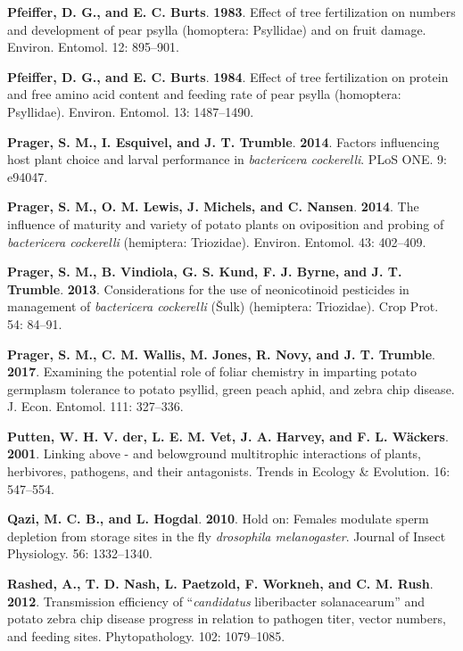 \documentclass[]{article}
\begin{document}
\leavevmode\hypertarget{ref-Pfeiffer1983}{}%
\textbf{Pfeiffer, D. G., and E. C. Burts}. \textbf{1983}. Effect of tree
fertilization on numbers and development of pear psylla (homoptera:
Psyllidae) and on fruit damage. Environ. Entomol. 12: 895--901.

\leavevmode\hypertarget{ref-Pfeiffer1984}{}%
\textbf{Pfeiffer, D. G., and E. C. Burts}. \textbf{1984}. Effect of tree
fertilization on protein and free amino acid content and feeding rate of
pear psylla (homoptera: Psyllidae). Environ. Entomol. 13: 1487--1490.

\leavevmode\hypertarget{ref-Prager2014a}{}%
\textbf{Prager, S. M., I. Esquivel, and J. T. Trumble}. \textbf{2014}.
Factors influencing host plant choice and larval performance in
\emph{bactericera cockerelli}. PLoS ONE. 9: e94047.

\leavevmode\hypertarget{ref-Prager2014b}{}%
\textbf{Prager, S. M., O. M. Lewis, J. Michels, and C. Nansen}.
\textbf{2014}. The influence of maturity and variety of potato plants on
oviposition and probing of \emph{bactericera cockerelli} (hemiptera:
Triozidae). Environ. Entomol. 43: 402--409.

\leavevmode\hypertarget{ref-Prager2013}{}%
\textbf{Prager, S. M., B. Vindiola, G. S. Kund, F. J. Byrne, and J. T.
Trumble}. \textbf{2013}. Considerations for the use of neonicotinoid
pesticides in management of \emph{bactericera cockerelli} (Šulk)
(hemiptera: Triozidae). Crop Prot. 54: 84--91.

\leavevmode\hypertarget{ref-Prager2017}{}%
\textbf{Prager, S. M., C. M. Wallis, M. Jones, R. Novy, and J. T.
Trumble}. \textbf{2017}. Examining the potential role of foliar
chemistry in imparting potato germplasm tolerance to potato psyllid,
green peach aphid, and zebra chip disease. J. Econ. Entomol. 111:
327--336.

\leavevmode\hypertarget{ref-Putten2001}{}%
\textbf{Putten, W. H. V. der, L. E. M. Vet, J. A. Harvey, and F. L.
Wäckers}. \textbf{2001}. Linking above - and belowground multitrophic
interactions of plants, herbivores, pathogens, and their antagonists.
Trends in Ecology \& Evolution. 16: 547--554.

\leavevmode\hypertarget{ref-Qazi2010}{}%
\textbf{Qazi, M. C. B., and L. Hogdal}. \textbf{2010}. Hold on: Females
modulate sperm depletion from storage sites in the fly \emph{drosophila
melanogaster}. Journal of Insect Physiology. 56: 1332--1340.

\leavevmode\hypertarget{ref-Rashed2012}{}%
\textbf{Rashed, A., T. D. Nash, L. Paetzold, F. Workneh, and C. M.
Rush}. \textbf{2012}. Transmission efficiency of ``\emph{candidatus}
liberibacter solanacearum'' and potato zebra chip disease progress in
relation to pathogen titer, vector numbers, and feeding sites.
Phytopathology. 102: 1079--1085.
\end{document}
